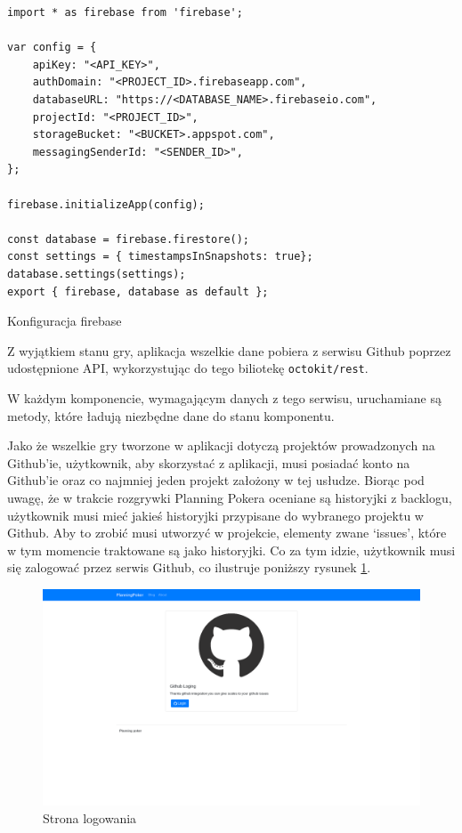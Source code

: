 \begin{listing}
\begin{verbatim}
import * as firebase from 'firebase';

var config = {
    apiKey: "<API_KEY>",
    authDomain: "<PROJECT_ID>.firebaseapp.com",
    databaseURL: "https://<DATABASE_NAME>.firebaseio.com",
    projectId: "<PROJECT_ID>",
    storageBucket: "<BUCKET>.appspot.com",
    messagingSenderId: "<SENDER_ID>",
};

firebase.initializeApp(config);

const database = firebase.firestore();
const settings = { timestampsInSnapshots: true};
database.settings(settings);
export { firebase, database as default };
\end{verbatim}
\caption{Konfiguracja firebase} \label{listing:firebaseConfig}
\end{listing}

Z wyjątkiem stanu gry, aplikacja wszelkie dane pobiera z serwisu Github poprzez
udostępnione API, wykorzystując do tego biliotekę \texttt{octokit/rest}.

W każdym komponencie, wymagającym danych z tego serwisu,
uruchamiane są metody, które ładują niezbędne dane do stanu komponentu.

Jako że wszelkie gry tworzone w aplikacji dotyczą projektów prowadzonych na Github'ie,
użytkownik, aby skorzystać z aplikacji, musi posiadać konto na Github'ie oraz co najmniej
jeden projekt założony w tej usłudze.
Biorąc pod uwagę, że w trakcie rozgrywki Planning Pokera oceniane są historyjki z backlogu,
użytkownik musi mieć jakieś historyjki przypisane do wybranego projektu w Github.
Aby to zrobić musi utworzyć w projekcie, elementy zwane `issues', które w tym momencie traktowane są jako historyjki.
Co za tym idzie, użytkownik musi się zalogować przez serwis Github, co ilustruje poniższy rysunek \ref{rys:login}.

\begin{figure}
	\centering\includegraphics[width=.7\textwidth]{img/GitLogin}
	\caption{Strona logowania}\label{rys:login}%
\end{figure}


